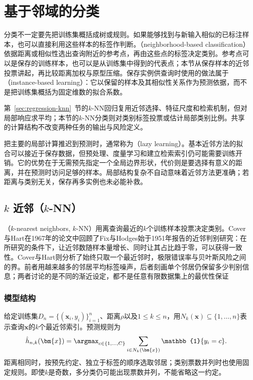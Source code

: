 \section{基于邻域的分类}
\label{sec:classification-instances}

分类不一定要先把训练集概括成树或规则。如果能够找到与新输入相似的已标注样本，也可以直接利用这些样本的标签作判断。（neighborhood-based classification）依据距离或相似性选出查询附近的参考点，再由这些点的标签决定类别。参考点可以是保存的训练样本，也可以是从训练集中得到的代表点；本节从保存样本的近邻投票讲起，再比较距离加权与原型压缩。保存实例供查询时使用的做法属于（instance-based learning）：它以保留的样本及其相似性关系作为预测依据，而不是把训练集概括为固定维数的拟合系数。

第~\ref{sec:regression-knn}~节的$k$-NN回归复用近邻选择、特征尺度和检索机制，但对局部响应求平均；本节的$k$-NN分类则对类别标签投票或估计局部类别比例。共享的计算结构不改变两种任务的输出与风险定义。

把主要的局部计算推迟到预测时，通常称为（lazy learning）。基本近邻方法的拟合可以接近于保存数据，但预处理、度量学习和建立检索索引仍可能需要训练开销。它的优势在于无需预先指定一个全局边界形状，代价则是要选择有意义的距离，并在预测时访问足够的样本。局部结构复杂不自动意味着近邻方法更准确；若距离与类别无关，保存再多实例也未必能补救。

\subsection{$k$ 近邻（$k$-NN）}
\label{sec:classification-knn}

（$k$-nearest neighbors, $k$-NN）用离查询最近的$k$个训练样本投票决定类别。Cover与Hart在1967年的论文中回顾了Fix与Hodges始于1951年报告的近邻判别研究：在所研究的条件下，让近邻数随样本量增长、同时让其占比趋于零，可以获得一致性。Cover与Hart则分析了始终只取一个最近邻时，极限错误率与贝叶斯风险之间的界。前者用越来越多的邻居平均标签噪声，后者刻画单个邻居仍保留多少判别信息；两者讨论的是不同的渐近设定，都不是任意有限数据集上的最优性保证

\subsubsection{模型结构}
\label{sec:classification-knn-structure}

给定训练集$D_n=\{(\bm{x}_i,y_i)\}_{i=1}^n$、距离$\rho$以及$1\leq k\leq n$，用$N_k(\bm{x})\subseteq\{1,\ldots,n\}$表示查询$\bm{x}$的$k$个最近邻索引。预测规则为
\begin{equation}
  \hat h_{n,k}(\bm{x})
  =\argmax_{c\in\{1,\ldots,C\}}
  \sum_{i\in N_k(\bm{x})}\mathbb{1}\{y_i=c\}.
  \label{eq:classification-knn-vote}
\end{equation}
距离相同时，按预先约定、独立于标签的顺序选取邻居；类别票数并列时也使用固定规则。即使$k$是奇数，多分类仍可能出现票数并列，不能省略这一约定。

